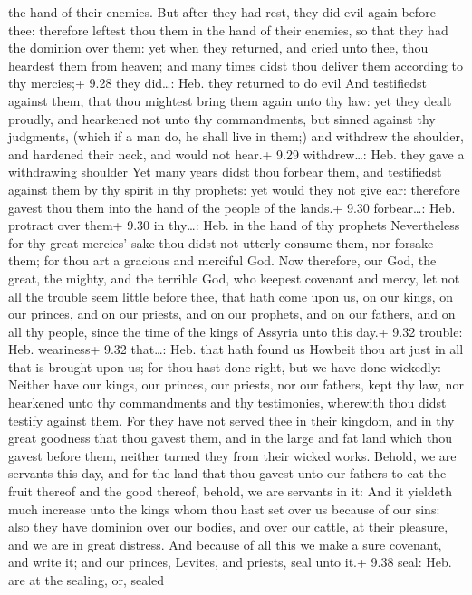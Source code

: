 the hand of their enemies.  But after they had rest, they
did evil again before thee: therefore leftest thou them in the hand of
their enemies, so that they had the dominion over them: yet when they
returned, and cried unto thee, thou heardest them from heaven; and many
times didst thou deliver them according to thy mercies;+ 9.28 they
did\ldots: Heb. they returned to do evil  And testifiedst
against them, that thou mightest bring them again unto thy law: yet they
dealt proudly, and hearkened not unto thy commandments, but sinned
against thy judgments, (which if a man do, he shall live in them;) and
withdrew the shoulder, and hardened their neck, and would not hear.+
9.29 withdrew\ldots: Heb. they gave a withdrawing shoulder 
Yet many years didst thou forbear them, and testifiedst against them by
thy spirit in thy prophets: yet would they not give ear: therefore
gavest thou them into the hand of the people of the lands.+ 9.30
forbear\ldots: Heb. protract over them+ 9.30 in thy\ldots: Heb. in the
hand of thy prophets  Nevertheless for thy great mercies'
sake thou didst not utterly consume them, nor forsake them; for thou art
a gracious and merciful God.  Now therefore, our God, the
great, the mighty, and the terrible God, who keepest covenant and mercy,
let not all the trouble seem little before thee, that hath come upon us,
on our kings, on our princes, and on our priests, and on our prophets,
and on our fathers, and on all thy people, since the time of the kings
of Assyria unto this day.+ 9.32 trouble: Heb. weariness+ 9.32
that\ldots: Heb. that hath found us  Howbeit thou art just
in all that is brought upon us; for thou hast done right, but we have
done wickedly:  Neither have our kings, our princes, our
priests, nor our fathers, kept thy law, nor hearkened unto thy
commandments and thy testimonies, wherewith thou didst testify against
them.  For they have not served thee in their kingdom, and
in thy great goodness that thou gavest them, and in the large and fat
land which thou gavest before them, neither turned they from their
wicked works.  Behold, we are servants this day, and for
the land that thou gavest unto our fathers to eat the fruit thereof and
the good thereof, behold, we are servants in it:  And it
yieldeth much increase unto the kings whom thou hast set over us because
of our sins: also they have dominion over our bodies, and over our
cattle, at their pleasure, and we are in great distress. 
And because of all this we make a sure covenant, and write it; and our
princes, Levites, and priests, seal unto it.+ 9.38 seal: Heb. are at the
sealing, or, sealed

